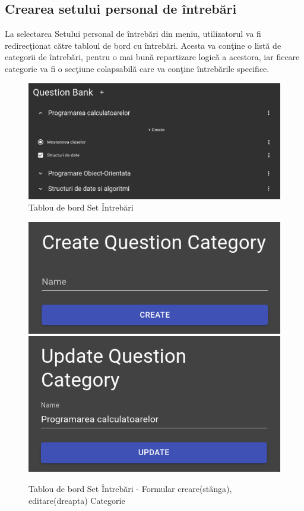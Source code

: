 \documentclass[12pt, a4paper, oneside, romanian]{teza-upb}
\begin{document}
\subsection{Crearea setului personal de întrebări}

La selectarea Setului personal de întrebări din meniu, utilizatorul va fi redirecţionat către tabloul de bord cu întrebări. Acesta va conţine o listă de categorii de întrebări, pentru o mai bună repartizare logică a acestora, iar fiecare categorie va fi o secţiune colapsabilă care va conţine întrebările specifice.

\begin{figure}[H]
\centering
\includegraphics*[width=\columnwidth]{tablou-de-bord-set-intrebari}
\caption{Tablou de bord Set Întrebări}
\label{tablou-de-bord-set-intrebari}
\end{figure}

\begin{figure}[H]
\centering
\includegraphics*[width=0.45\columnwidth]{tablou-de-bord-set-intrebari-creare-categorie}
\includegraphics*[width=0.45\columnwidth]{tablou-de-bord-set-intrebari-editare-categorie}
\caption{Tablou de bord Set Întrebări - Formular creare(stânga), editare(dreapta) Categorie}
\label{tablou-de-bord-set-intrebari-categorie}
\end{figure}
\end{document}
